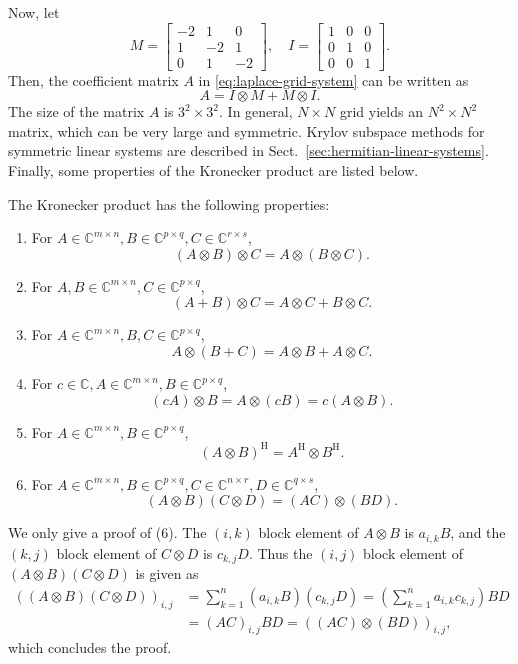 {Now, let}
\[M=\begin{bmatrix}-2&1&0\\1&-2&1\\0&1&-2\end{bmatrix},\quad I=\begin{bmatrix}1&0&0\\0&1&0\\0&0&1\end{bmatrix}.\]
{Then, the coefficient matrix $A$ in \eqref{eq:laplace-grid-system} can be written as}
\begin{equation}\label{eq:laplace-kronecker-sum}
A=I\otimes M+M\otimes I.
\end{equation}
{The size of the matrix $A$ is $3^2\times3^2$. In general, $N\times N$ grid yields an $N^2\times N^2$ matrix, which can be very large and symmetric. Krylov subspace methods for symmetric linear systems are described in Sect.\ \ref{sec:hermitian-linear-systems}. Finally, some properties of the Kronecker product are listed below.}
\begin{Theorem}\label{thm:kronecker-product-properties}
{The Kronecker product has the following properties:}
\begin{enumerate}
\item {For $A\in\mathbb{C}^{m\times n},B\in\mathbb{C}^{p\times q},C\in\mathbb{C}^{r\times s}$,}
\[(A\otimes B)\otimes C=A\otimes(B\otimes C).\]
\item {For $A,B\in\mathbb{C}^{m\times n},C\in\mathbb{C}^{p\times q}$,}
\[(A+B)\otimes C=A\otimes C+B\otimes C.\]
\item {For $A\in\mathbb{C}^{m\times n},B,C\in\mathbb{C}^{p\times q}$,}
\[A\otimes(B+C)=A\otimes B+A\otimes C.\]
\item {For $c\in\mathbb{C},A\in\mathbb{C}^{m\times n},B\in\mathbb{C}^{p\times q}$,}
\[(cA)\otimes B=A\otimes(cB)=c(A\otimes B).\]
\item {For $A\in\mathbb{C}^{m\times n},B\in\mathbb{C}^{p\times q}$,}
\[(A\otimes B)^{\mathrm H}=A^{\mathrm H}\otimes B^{\mathrm H}.\]
\item {For $A\in\mathbb{C}^{m\times n},B\in\mathbb{C}^{p\times q},C\in\mathbb{C}^{n\times r},D\in\mathbb{C}^{q\times s}$,}
\[(A\otimes B)(C\otimes D)=(AC)\otimes(BD).\]
\end{enumerate}
\end{Theorem}
\begin{Proof}
{We only give a proof of (6). The $(i,k)$ block element of $A\otimes B$ is $a_{i,k}B$, and the $(k,j)$ block element of $C\otimes D$ is $c_{k,j}D$. Thus the $(i,j)$ block element of $(A\otimes B)(C\otimes D)$ is given as}
\[\begin{aligned}
((A\otimes B)(C\otimes D))_{i,j}&=\sum_{k=1}^n(a_{i,k}B)(c_{k,j}D)=\left(\sum_{k=1}^na_{i,k}c_{k,j}\right)BD\\
&=(AC)_{i,j}BD=((AC)\otimes(BD))_{i,j},
\end{aligned}\]
{which concludes the proof.}
\end{Proof}
